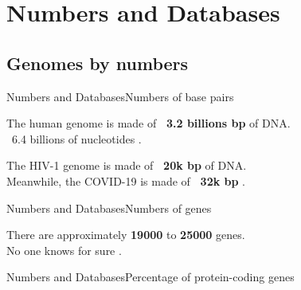 \documentclass[10pt]{beamer}
\begin{document}
{\section{Numbers and Databases}

\subsection{Genomes by numbers}

\begin{frame}{Numbers and Databases}{Numbers of base pairs}

\begin{block}{}
\centering
The human genome is made of \textbf{\string ~3.2 billions bp} of DNA. \\
\string ~6.4 billions of nucleotides \cite{archibald2018genomics}.
\end{block}

\begin{block}{}
\centering
The HIV-1 genome is made of \textbf{\string ~20k bp} of DNA. \\
Meanwhile, the COVID-19 is made of \textbf{\string ~32k bp} \cite{randhawa2020machine}.
\end{block}


\end{frame}

\begin{frame}{Numbers and Databases}{Numbers of genes}

\begin{block}{}
\centering
There are approximately \textbf{19000} to \textbf{25000} genes. \\
No one knows for sure \cite{archibald2018genomics}.
\end{block}
\end{frame}

\begin{frame}{Numbers and Databases}{Percentage of protein-coding genes}


\end{frame}}
\end{document}
